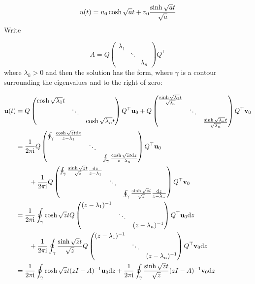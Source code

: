 \documentclass[12pt,a4paper]{article}
\def\D{ {\rm d} }
\def\I{ {\rm i} }
\def\vc#1{ {\mathbf #1} }
\def\dz{\D z}
\begin{document}
\[
u(t) = u_0 \cosh \sqrt{a} t + v_0 {\sinh \sqrt{a} t \over \sqrt a}
\]
Write 

\[
A = Q \begin{pmatrix} \lambda_1 \\ & \ddots \\
                        && \lambda_n \end{pmatrix}  Q^\top
\]
where $\lambda_k > 0$  and then the solution has the form, where $\gamma$ is a contour surrounding the eigenvalues and to the right of zero: 


\begin{align*}
    \vc u(t) &= Q \begin{pmatrix} \cosh \sqrt{\lambda_1} t \\ & \ddots \\
                        && \cosh \sqrt{\lambda_n} t  \end{pmatrix}  Q^\top \vc u_0 + 
                        Q \begin{pmatrix} {\sinh \sqrt{\lambda_1} t \over \sqrt{\lambda_1}}\\ & \ddots \\
                        && {\sinh \sqrt{\lambda_n} t \over \sqrt{\lambda_n}} \end{pmatrix}  Q^\top \vc v_0 \\
              &= {1 \over 2 \pi \I} Q \begin{pmatrix}  \oint_\gamma {\cosh \sqrt{z} t  \dz \over z - \lambda_1}\\ & \ddots \\
                        &&  \oint_\gamma {\cosh \sqrt{z} t  \dz \over z - \lambda_n}\end{pmatrix}  Q^\top \vc u_0 \\
& \qquad + 
                        {1 \over 2 \pi \I} Q \begin{pmatrix} \oint_\gamma {\sinh \sqrt{z} t \over \sqrt z} {\dz   \over z - \lambda_1}  \\ & \ddots \\
                        && \oint_\gamma {\sinh \sqrt{z} t \over \sqrt z} {\dz   \over z - \lambda_n}  \end{pmatrix}  Q^\top \vc v_0 \\
&= {1 \over 2 \pi \I} \oint_\gamma \cosh \sqrt{z} t   Q \begin{pmatrix}  (z - \lambda_1)^{-1}\\ & \ddots \\
                        &&    (z - \lambda_n)^{-1}\end{pmatrix}  Q^\top \vc u_0 \dz \\
&\qquad +  {1 \over 2 \pi \I} \oint_\gamma {\sinh \sqrt{z} t \over \sqrt z}   Q \begin{pmatrix}  (z - \lambda_1)^{-1}\\ & \ddots \\
                        &&    (z - \lambda_n)^{-1}\end{pmatrix}  Q^\top \vc v_0 \dz \\
&= {1 \over 2 \pi \I} \oint_\gamma \cosh \sqrt{z} t  (z I - A)^{-1} \vc u_0 \dz +  {1 \over 2 \pi \I} \oint_\gamma {\sinh \sqrt{z} t \over \sqrt z}   (z I - A)^{-1} \vc v_0 \dz                         
\end{align*}
\end{document}
